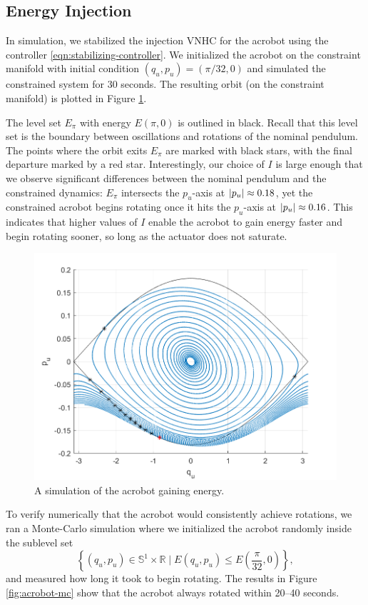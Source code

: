 \documentclass[journal,twoside,web]{ieeecolor}
\DeclarePairedDelimiter{\abs}{\lvert}{\rvert}
\newcommand*{\R}{\mathbb{R}}
\newcommand*{\Sone}{\mathbb{S}^1}
\newcommand*{\SxR}{\Sone \times \R}
\begin{document}
{\subsection{Energy Injection}

In simulation, we stabilized the injection VNHC for the acrobot using the
controller \eqref{eqn:stabilizing-controller}.
We initialized the acrobot on the constraint manifold
with initial condition \((q_u,p_u) = \left(\pi/32,0 \right)\) and simulated the
constrained system for \(30\) seconds.
The resulting orbit (on the constraint manifold) is plotted in Figure
\ref{fig:acrobot-in-orbit}.

The level set \(E_\pi\) with energy \(E(\pi,0)\) is outlined in black.
Recall that this level set is the boundary between oscillations and rotations of the
nominal pendulum.
The points where the orbit exits \(E_\pi\) are marked with black stars,
with the final departure marked by a red star.
Interestingly, our choice of \(I\) is large enough that we observe significant
differences between the nominal pendulum and the constrained dynamics:
\(E_\pi\) intersects the \(p_u\)-axis at \(\abs{p_u} \approx 0.18\), yet the
constrained acrobot begins rotating once it hits the
\(p_u\)-axis at \(\abs{p_u} \approx 0.16\). 
This indicates that higher values of \(I\) enable the acrobot to gain energy
faster and begin rotating sooner, so long as the actuator does not saturate.

\begin{figure}[]
    \centering
    \includegraphics[width=0.8\linewidth]{acrobot_in_orbit.png}
    \caption{A simulation of the acrobot gaining energy.}
    \label{fig:acrobot-in-orbit}
\end{figure}

To verify numerically that the acrobot would consistently achieve rotations, we
ran a Monte-Carlo \cite{montecarlo} simulation where we initialized the acrobot
randomly inside the sublevel set
\[
    \left\{(q_u,p_u) \in \SxR \mid
    E(q_u,p_u) \leq E\left(\frac{\pi}{32},0\right)\right\}
    ,
\] 
and measured how long it took to begin rotating.
The results in Figure \ref{fig:acrobot-mc} show that
the acrobot always rotated within 20--40 seconds.

}
\end{document}
